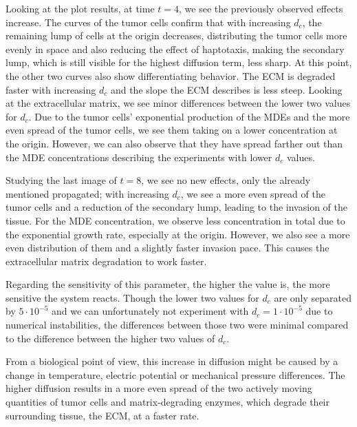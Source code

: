Looking at the plot results, at time $t=4$, we see the previously observed effects increase. The curves of the tumor cells confirm that with increasing $d_c$, the remaining lump of cells at the origin decreases, distributing the tumor cells more evenly in space and also reducing the effect of haptotaxis, making the secondary lump, which is still visible for the highest diffusion term, less sharp. At this point, the other two curves also show differentiating behavior. The ECM is degraded faster with increasing $d_c$ and the slope the ECM describes is less steep. Looking at the extracellular matrix, we see minor differences between the lower two values for $d_c$. Due to the tumor cells' exponential production of the MDEs and the more even spread of the tumor cells, we see them taking on a lower concentration at the origin. However, we can also observe that they have spread farther out than the MDE concentrations describing the experiments with lower $d_c$ values.

Studying the last image of $t=8$, we see no new effects, only the already mentioned propagated; with increasing $d_c$, we see a more even spread of the tumor cells and a reduction of the secondary lump, leading to the invasion of the tissue. For the MDE concentration, we observe less concentration in total due to the exponential growth rate, especially at the origin. However, we also see a more even distribution of them and a slightly faster invasion pace. This causes the extracellular matrix degradation to work faster.

Regarding the sensitivity of this parameter, the higher the value is, the more sensitive the system reacts. Though the lower two values for $d_c$ are only separated by $5\cdot 10^{-5}$ and we can unfortunately not experiment with $d_c=1 \cdot 10^{-5}$ due to numerical instabilities, the differences between those two were minimal compared to the difference between the higher two values of $d_c$.

From a biological point of view, this increase in diffusion might be caused by a change in temperature, electric potential or mechanical pressure differences. The higher diffusion results in a more even spread of the two actively moving quantities of tumor cells and matrix-degrading enzymes, which degrade their surrounding tissue, the ECM, at a faster rate.


